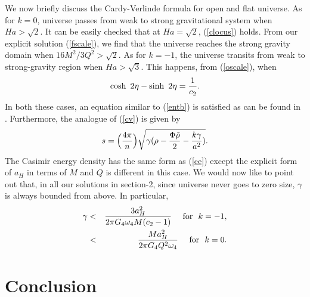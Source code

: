 \documentclass[a4paper,11pt]{article}
\begin{document}
We now briefly discuss the Cardy-Verlinde formula for open and flat 
universe. As for $k =0$, universe passes from weak to strong gravitational 
system when $Ha > {\sqrt{2}}$. It can be easily checked that at $Ha =
{\sqrt{2}}$, (\ref{clocus}) holds. From our explicit 
solution (\ref{fscale}), we find that the universe reaches  the 
strong gravity domain when $16 M^2/3 Q^2 > \sqrt 2$. As for $k = -1$, the 
universe transits from weak to strong-gravity region when 
$Ha > \sqrt 3$. This happens, from (\ref{oscale}), when 
\begin{equation}
\cosh~2\eta - \sinh~2\eta = {1\over { c_2}}.
\end{equation}
In both these cases, an equation similar to (\ref{entb}) is satisfied as 
can be found in \cite{DY}. Furthermore, the analogue of (\ref{cv}) is 
given by \cite{DY}
\begin{equation}
s = \Big({4 \pi\over n}\Big) \sqrt {\gamma (\rho - {\Phi \tilde \rho\over
2} - {k\gamma\over {a^2}})}.
\label{cvof}
\end{equation}
The Casimir energy density has the same form as (\ref{ce}) except the 
explicit form of $a_H$ in terms of $M$ and $Q$ is different in this case.
We would now like to point out that, in all our solutions in section-2, 
since universe never goes to zero size, $\gamma$ is always bounded from 
above. In particular, 
\begin{eqnarray}
\gamma &<& {3 a_H^2\over {2 \pi G_4 \omega_4 M (c_2 -1)}}
~~~~{\rm for}~~k = -1,\nonumber\\
       &<& {M a_H^2 \over{2\pi G_4 Q^2 \omega_4}}
~~~~{\rm for}~~k =0.
\end{eqnarray}






\section{Conclusion\label{CONCLUSION}}
\end{document}
